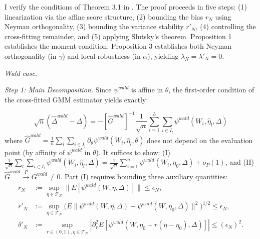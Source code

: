 \begin{theoremproof}


\medskip
\noindent I verify the conditions of Theorem 3.1 in \cite{DDML2018}. The proof proceeds in five steps: (1) linearization via the affine score structure, (2) bounding the bias $r_N$ using Neyman orthogonality, (3) bounding the variance stability $r'_N$, (4) controlling the cross-fitting remainder, and (5) applying Slutsky's theorem. Proposition 1 establishes the moment condition. Proposition 3 establishes both Neyman orthogonality (in $\gamma$) and local robustness (in $\alpha$), yielding $\lambda_N = \lambda'_N = 0$.

\medskip
\noindent\textit{Wald case.}

    \textit{Step 1: Main Decomposition.} Since $\psi^{wald}$ is affine in $\theta$, the first-order condition of the cross-fitted GMM estimator yields exactly:

    \begin{equation*}
        \sqrt{n}(\hat{\Delta}^{wald} - \Delta) = -[\hat{G}^{wald}]^{-1} \frac{1}{\sqrt{n}} \sum_{l=1}^L \sum_{i \in I_l} \psi^{wald}(W_i, \hat{\eta}_l, \Delta)
    \end{equation*}
    where $\hat{G}^{wald} = \frac{1}{n}\sum_{l}\sum_{i \in I_l} \partial_\theta \psi^{wald}(W_i, \hat{\eta}_l, \theta)$ does not depend on the evaluation point (by affinity of $\psi^{wald}$ in $\theta$). It suffices to show: (I) $\frac{1}{\sqrt{n}}\sum_{l}\sum_{i \in I_l} \psi^{wald}(W_i, \hat{\eta}_l, \Delta) = \frac{1}{\sqrt{n}}\sum_{i=1}^n \psi^{wald}(W_i, \eta_0, \Delta) + o_P(1)$, and (II) $\hat{G}^{wald} \xrightarrow{P} G^{wald} \neq 0$. Part (I) requires bounding three auxiliary quantities:
    \begin{align}
    r_N&:=\sup_{\eta \in \mathcal{T}_N} \| E[\psi^{wald}(W, \eta, \Delta)]\|\leq \epsilon_N, \tag{A.1} \\
   r'_N&:=\sup_{\eta \in \mathcal{T}_N} \Big( E\|\psi^{wald}(W, \eta, \Delta) - \psi^{wald}(W, \eta_0, \Delta) \|^2  \Big)^{1/2} \leq \epsilon_N, \tag{A.2} \\
    \delta'_N&:=\sup_{r \in (0,1),\eta \in \mathcal{T}_N} \left|\partial^2_r E \left[ \psi^{wald}(W,\eta_0 + r (\eta - \eta_0), \Delta) \right]\right| \leq (\epsilon_N)^2. \tag{A.3}
    \end{align}


\end{theoremproof}
